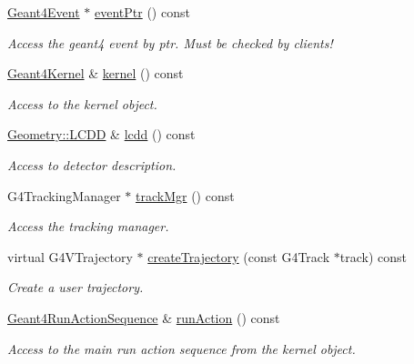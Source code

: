 \begin{DoxyCompactItemize}
\hyperlink{class_d_d4hep_1_1_simulation_1_1_geant4_event}{Geant4\+Event} $\ast$ \hyperlink{class_d_d4hep_1_1_simulation_1_1_geant4_context_a2f26e1b3fecec8178880ce8e379f6531}{event\+Ptr} () const
\begin{DoxyCompactList}\small\item\em Access the geant4 event by ptr. Must be checked by clients! \end{DoxyCompactList}\item 
\hyperlink{class_d_d4hep_1_1_simulation_1_1_geant4_kernel}{Geant4\+Kernel} \& \hyperlink{class_d_d4hep_1_1_simulation_1_1_geant4_context_a4374827bf9949372b0e79fb952b186d7}{kernel} () const
\begin{DoxyCompactList}\small\item\em Access to the kernel object. \end{DoxyCompactList}\item 
\hyperlink{class_d_d4hep_1_1_geometry_1_1_l_c_d_d}{Geometry\+::\+L\+C\+DD} \& \hyperlink{class_d_d4hep_1_1_simulation_1_1_geant4_context_a209ec3ce0935cf5ac3734626c2eca1d3}{lcdd} () const
\begin{DoxyCompactList}\small\item\em Access to detector description. \end{DoxyCompactList}\item 
G4\+Tracking\+Manager $\ast$ \hyperlink{class_d_d4hep_1_1_simulation_1_1_geant4_context_adef15e8cef190429b9d0510b74a42b3c}{track\+Mgr} () const
\begin{DoxyCompactList}\small\item\em Access the tracking manager. \end{DoxyCompactList}\item 
virtual G4\+V\+Trajectory $\ast$ \hyperlink{class_d_d4hep_1_1_simulation_1_1_geant4_context_ac47c311e301ba100e6cdd432e7bd8265}{create\+Trajectory} (const G4\+Track $\ast$track) const
\begin{DoxyCompactList}\small\item\em Create a user trajectory. \end{DoxyCompactList}\item 
\hyperlink{class_d_d4hep_1_1_simulation_1_1_geant4_run_action_sequence}{Geant4\+Run\+Action\+Sequence} \& \hyperlink{class_d_d4hep_1_1_simulation_1_1_geant4_context_a09d7a2ebd9619cb941cbb079a3171113}{run\+Action} () const
\begin{DoxyCompactList}\small\item\em Access to the main run action sequence from the kernel object. \end{DoxyCompactList}\item 

\end{DoxyCompactItemize}
